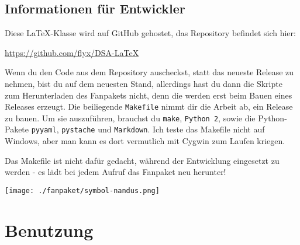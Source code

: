 \documentclass{dsa}
\begin{document}
   \begin{dsaBoxPortrait}
      \subsection*{\normalsize Informationen für Entwickler}
      
      Diese LaTeX-Klasse wird auf GitHub gehostet, das Repository befindet sich
      hier:
      
      \url{https://github.com/flyx/DSA-LaTeX}
      
      Wenn du den Code aus dem Repository aus\-checkst, statt das neueste
      Release zu nehmen, bist du auf dem neuesten Stand, allerdings hast du
      dann die Skripte zum Herunterladen des Fanpakets nicht, denn die werden
      erst beim Bauen eines Releases erzeugt. Die beiliegende \texttt{Makefile}
      nimmt dir die Arbeit ab, ein Release zu bauen. Um sie auszuführen, brauchst
      du \texttt{make}, \texttt{Python 2}, sowie die Python-Pakete
      \texttt{pyyaml}, \texttt{pystache} und \texttt{Markdown}. Ich teste das
      Makefile nicht auf Windows, aber man kann es dort vermutlich mit
      Cygwin zum Laufen kriegen. 
      
      Das Makefile ist nicht dafür gedacht, während der Entwicklung eingesetzt
      zu werden - es lädt bei jedem Aufruf das Fanpaket neu herunter!
      
   \end{dsaBoxPortrait}
   
   \begin{center}
      \texttt{[image: ./fanpaket/symbol-nandus.png]}
   \end{center}
   
   \onecolumn
   
   \section*{Benutzung}
   
\end{document}
